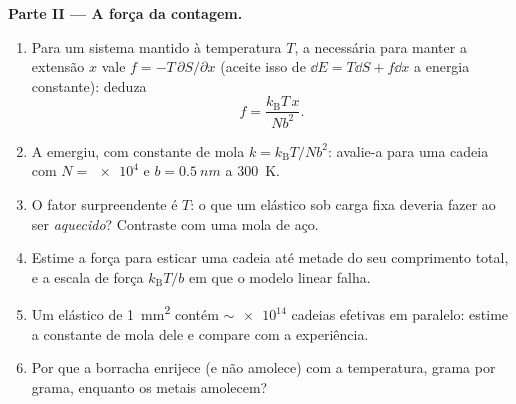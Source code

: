 \begin{problem}
\medskip\noindent\textbf{Parte II --- A força da contagem.}
\begin{enumerate}[resume]
  \item Para um sistema mantido à temperatura $T$, a 
        necessária para manter a extensão $x$ vale
        $f = -T\,\partial S/\partial x$ (aceite isso de
        $\dd E = T\dd S + f\dd x$ a energia constante): deduza
        \[
        f = \frac{k_{\text{B}}T\,x}{Nb^2} .
        \]
  \item A  emergiu, com constante de mola $k =
        k_{\text{B}}T/Nb^2$: avalie-a para uma cadeia com $N =
        \num{e4}$ e $b = \qty{0.5}{nm}$ a \qty{300}{K}.
  \item O fator surpreendente é $T$: o que um elástico sob carga fixa
        deveria fazer ao ser \emph{aquecido}? Contraste com uma mola de
        aço.
  \item Estime a força para esticar uma cadeia até metade do seu
        comprimento total, e a escala de força $k_{\text{B}}T/b$ em que
        o modelo linear falha.
  \item Um elástico de  \qty{1}{mm^2} contém
        $\sim\num{e14}$ cadeias efetivas em paralelo: estime a
        constante de mola dele e compare com a experiência.
  \item Por que a borracha enrijece (e não amolece) com a temperatura,
        grama por grama, enquanto os metais amolecem?
\end{enumerate}


\end{problem}
